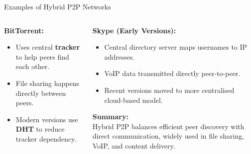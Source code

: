 \documentclass[aspectratio=169, table]{beamer}
\begin{document}
\begin{frame}{Examples of Hybrid P2P Networks}
	\vspace{20pt}
	\begin{columns}[t]
		
		\begin{column}{0.5\textwidth}
			\textbf{BitTorrent:}
			\begin{itemize}
				\item Uses central \textbf{tracker} to help peers find each other.
				\item File sharing happens directly between peers.
				\item Modern versions use \textbf{DHT} to reduce tracker dependency.
			\end{itemize}
		\end{column}
		
		\begin{column}{0.5\textwidth}
			\textbf{Skype (Early Versions):}
			\begin{itemize}
				\item Central directory server maps usernames to IP addresses.
				\item VoIP data transmitted directly peer-to-peer.
				\item Recent versions moved to more centralised cloud-based model.
			\end{itemize}
			
			\vspace{10pt}
			\textbf{Summary:} \\
			Hybrid P2P balances efficient peer discovery with direct communication, widely used in file sharing, VoIP, and content delivery.
		\end{column}
		
	\end{columns}
\end{frame}
\end{document}
